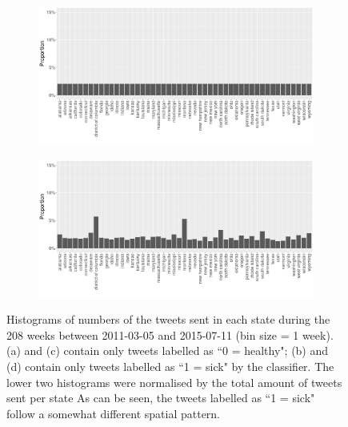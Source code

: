 \documentclass[11pt, a4paper,twoside]{report}\usepackage[]{graphicx}\usepackage[]{color}
\begin{document}
\begin{figure}[H]
    \begin{subfigure}[t]{0.49\textwidth}
  \includegraphics[width=1\linewidth]{activity_rel_healthy_statename_Twitter_full_aggregated.png}
  \caption{}
  \end{subfigure}
  \hfill
    \begin{subfigure}[t]{0.49\textwidth}
  \includegraphics[width=1\linewidth]{activity_rel_sick_statename_Twitter_full_aggregated.png}
  \caption{}
  \end{subfigure}
  \caption{Histograms of numbers of the tweets sent in each state during the 208 weeks between 2011-03-05 and 2015-07-11 (bin size = 1 week). (a) and (c) contain only tweets labelled as ``0 = healthy"; (b) and (d) contain only tweets labelled as ``1 = sick" by the classifier. The lower two histograms were normalised by the total amount of tweets sent per state As can be seen, the tweets labelled as ``1 = sick" follow a somewhat different spatial pattern.}
  \label{fig:tweets_state_healthy_sick}
\end{figure}
\end{document}
